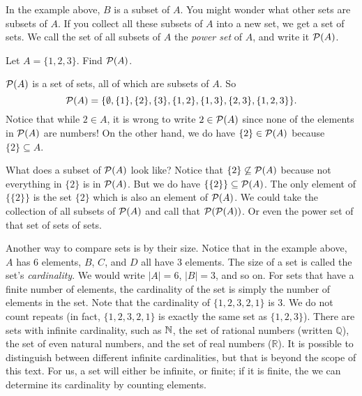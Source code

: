 \documentclass[12pt]{article}
\begin{document}
In the example above, $B$ is a subset of $A$.  You might wonder what other sets are subsets of $A$.  If you collect all these subsets of $A$ into a new set, we get a set of sets.  We call the set of all subsets of $A$ the \emph{power set} of $A$, and write it $\mathcal P(A)$.

\begin{example}
  Let $A = \{1,2,3\}$.  Find $\mathcal P(A)$.
  \begin{solution}
    $\mathcal P(A)$ is a set of sets, all of which are subsets of $A$.  So
    \[\mathcal P(A) = \{ \emptyset, \{1\}, \{2\}, \{3\}, \{1,2\}, \{1, 3\}, \{2,3\}, \{1,2,3\}\}.\]
    Notice that while $2 \in A$, it is wrong to write $2 \in \mathcal P(A)$ since none of the elements in $\mathcal P(A)$ are numbers!  On the other hand, we do have $\{2\} \in \mathcal P(A)$ because $\{2\} \subseteq A$.

    What does a subset of $\mathcal P(A)$ look like?  Notice that $\{2\} \not\subseteq \mathcal P(A)$ because not everything in $\{2\}$ is in $\mathcal P(A)$.  But we do have $\{ \{2\} \} \subseteq \mathcal P(A)$.  The only element of $\{\{2\}\}$ is the set $\{2\}$ which is also an element of $\mathcal P(A)$.  We could take the collection of all subsets of $\mathcal P(A)$ and call that $\mathcal P(\mathcal P(A))$.  Or even the power set of that set of sets of sets.
  \end{solution}

\end{example}


Another way to compare sets is by their size.  Notice that in the example above, $A$ has 6 elements, $B$, $C$, and $D$ all have 3 elements.  The size of a set is called the set's \emph{cardinality}.  We would write $|A| = 6$, $|B| = 3$, and so on.  For sets that have a finite number of elements, the cardinality of the set is simply the number of elements in the set.  Note that the cardinality of $\{ 1, 2, 3, 2, 1\}$ is 3. We do not count repeats (in fact, $\{1, 2, 3, 2, 1\}$ is exactly the same set as $\{1, 2, 3\}$).  There are sets with infinite cardinality, such as $\mathbb N$, the set of rational numbers (written $\mathbb Q$), the set of even natural numbers, and the set of real numbers ($\mathbb R$).  It is possible to distinguish between different infinite cardinalities, but that is beyond the scope of this text.  For us, a set will either be infinite, or finite; if it is finite, the we can determine its cardinality by counting elements.
\end{document}
